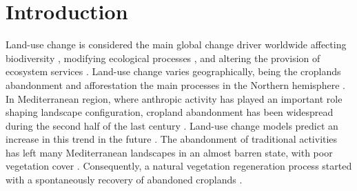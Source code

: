 \section{Introduction}\label{sec:coloniza:intro}

Land-use change is considered the main global change driver worldwide \autocites{Butchartetal2010GlobalBiodiversity,Winkleretal2021GlobalLand} affecting biodiversity \autocites{Sala2000GlobalBiodiversity}, modifying ecological processes \autocites{Lindenmayeretal2012LandUse}, and altering the provision of ecosystem services \autocites{Hasanetal2020ImpactLand}. Land-use change varies geographically, being the croplands abandonment and afforestation the main processes in the Northern hemisphere \autocites{Winkleretal2021GlobalLand,ReyBenayas2007AbandonmentAgricultural}. In Mediterranean region, where anthropic activity has played an important role shaping landscape configuration, cropland abandonment has been widespread during the second half of the last century \autocites{Piasetal2014ColonizationAbandoned,ValbuenaCarabanaetal2010HistoricalRecent,MartinezFernandezetal2015RecentLand}. Land-use change models predict an increase in this trend in the future \autocites{Rounsevelletal2006CoherentSet,PerpinaCastilloetal2021ModellingAgricultural}. The abandonment of traditional activities has left many Mediterranean landscapes in an almost barren state, with poor vegetation cover \autocites{Sheffer2012ReviewDevelopment, ReyBenayas2007AbandonmentAgricultural}. Consequently, a natural vegetation regeneration process started with a spontaneously recovery of abandoned croplands \autocites{Debusscheetal1999MediterraneanLandscape,PenuelasBoada2003GlobalChangeinduced,AlvarezMartinezetal2014InfluenceLand,Nataleetal2007StudyTree,Piussi2000ExpansionEuropean}. 

